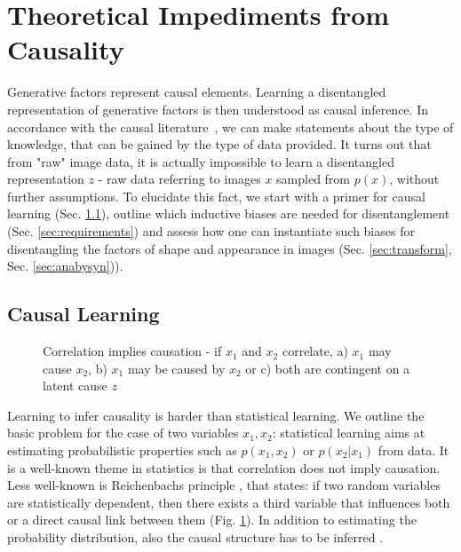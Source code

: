 \section{Theoretical Impediments from Causality}\label{sec:causality}


	Generative factors represent causal elements.
	Learning a disentangled representation of generative factors is then understood as causal inference.
	In accordance with the causal literature~\cite{pearl18impediments}, we can make statements about the type of knowledge, that can be gained by the type of data provided. It turns out that from "raw" image data, it is actually impossible to learn a disentangled representation $z$ - raw data referring to images $x$ sampled from $p(x)$, without further assumptions.
	To elucidate this fact, we start with a primer for causal learning (Sec. \ref{sec:causallearning}), outline which inductive biases are needed for disentanglement (Sec. \ref{sec:requirements}) and assess how one can instantiate such biases for disentangling the factors of shape and appearance in images (Sec. \ref{sec:transform}, Sec. \ref{sec:anabysyn})).

	\subsection{Causal Learning}\label{sec:causallearning}
		\begin{figure}[htp]
			\begin{subfigure}{0.3\linewidth}
				\centering
				
				\caption{}
			\end{subfigure}
			\begin{subfigure}{0.3\linewidth}
				\centering
				
				\caption{}
			\end{subfigure}
			\begin{subfigure}{0.3\linewidth}
				\centering
				
				\caption{}
			\end{subfigure}
			\caption{Correlation implies causation - if $x_1$ and $x_2$ correlate, a) $x_1$ may cause $x_2$,  b) $x_1$ may be caused by $x_2$ or c) both are contingent on a latent cause $z$}
			\label{fig:reichenbach}
		\end{figure}

		Learning to infer causality is harder than statistical learning. We outline the basic problem for the case of two variables $x_1, x_2$: statistical learning aims at estimating probabilistic properties such as $p(x_1, x_2)$ or  $p(x_2|x_1)$ from data.
		It is a well-known theme in statistics is that correlation does not imply causation. Less well-known is Reichenbachs principle \cite{peters17elements, reichenbach56time}, that states: if two random variables are statistically dependent, then there exists a third variable that influences both or a direct causal link between them (Fig. \ref{fig:reichenbach}).
		In addition to estimating the probability distribution, also the causal structure has to be inferred \cite{peters17elements}.

